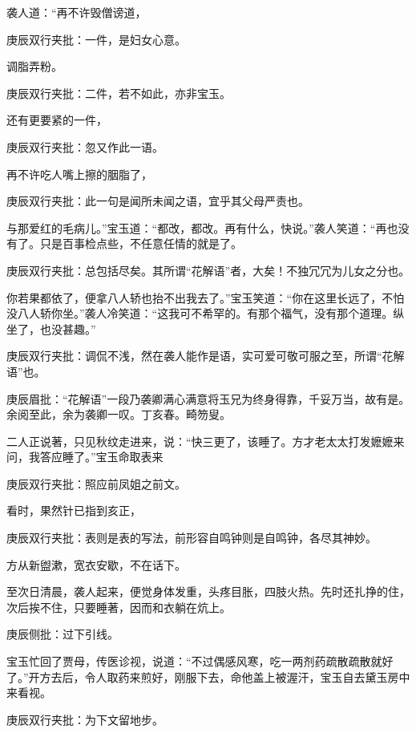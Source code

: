 \begin{parag}


    袭人道：“再不许毁僧谤道，\begin{note}庚辰双行夹批：一件，是妇女心意。\end{note}调脂弄粉。\begin{note}庚辰双行夹批：二件，若不如此，亦非宝玉。\end{note}还有更要紧的一件，\begin{note}庚辰双行夹批：忽又作此一语。\end{note}再不许吃人嘴上擦的胭脂了，\begin{note}庚辰双行夹批：此一句是闻所未闻之语，宜乎其父母严责也。\end{note}与那爱红的毛病儿。”宝玉道：“都改，都改。再有什么，快说。”袭人笑道：“再也没有了。只是百事检点些，不任意任情的就是了。\begin{note}庚辰双行夹批：总包括尽矣。其所谓“花解语”者，大矣！不独冗冗为儿女之分也。\end{note}你若果都依了，便拿八人轿也抬不出我去了。”宝玉笑道：“你在这里长远了，不怕没八人轿你坐。”袭人冷笑道：“这我可不希罕的。有那个福气，没有那个道理。纵坐了，也没甚趣。”\begin{note}庚辰双行夹批：调侃不浅，然在袭人能作是语，实可爱可敬可服之至，所谓“花解语”也。\end{note}\begin{note}庚辰眉批：“花解语”一段乃袭卿满心满意将玉兄为终身得靠，千妥万当，故有是。余阅至此，余为袭卿一叹。丁亥春。畸笏叟。\end{note}
\end{parag}


\begin{parag}


    二人正说著，只见秋纹走进来，说：“快三更了，该睡了。方才老太太打发嬷嬷来问，我答应睡了。”宝玉命取表来\begin{note}庚辰双行夹批：照应前凤姐之前文。\end{note}看时，果然针已指到亥正，\begin{note}庚辰双行夹批：表则是表的写法，前形容自鸣钟则是自鸣钟，各尽其神妙。\end{note}方从新盥漱，宽衣安歇，不在话下。
\end{parag}


\begin{parag}


    至次日清晨，袭人起来，便觉身体发重，头疼目胀，四肢火热。先时还扎挣的住，次后挨不住，只要睡著，因而和衣躺在炕上。\begin{note}庚辰侧批：过下引线。\end{note}宝玉忙回了贾母，传医诊视，说道：“不过偶感风寒，吃一两剂药疏散疏散就好了。”开方去后，令人取药来煎好，刚服下去，命他盖上被渥汗，宝玉自去黛玉房中来看视。\begin{note}庚辰双行夹批：为下文留地步。\end{note}
\end{parag}


